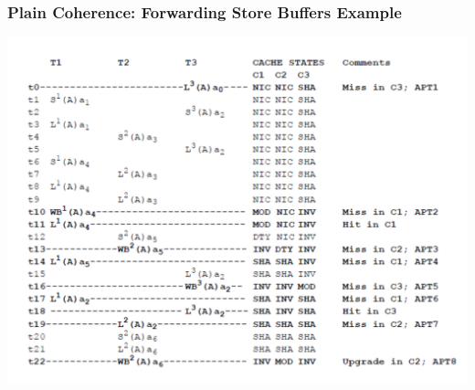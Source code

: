 \documentclass{beamer}
\begin{document}
\begin{frame}[fragile,t]
\frametitle{Plain Coherence: Forwarding Store Buffers Example}
\vspace{-3ex}

{\center \includegraphics[width=65ex]{Ch7Figs/FwdStoreBuffEG1}}\pause

\end{frame}
\end{document}
